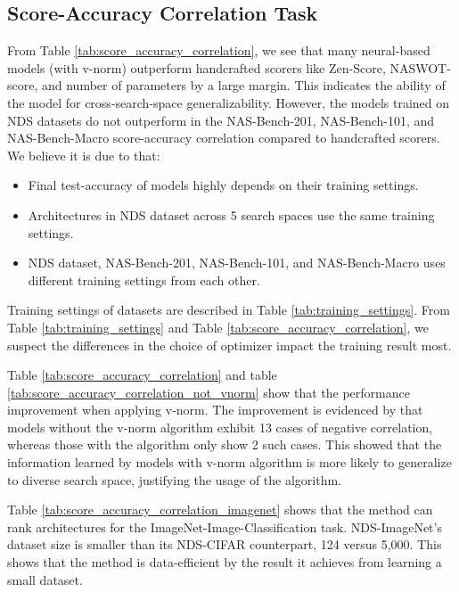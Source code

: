 \documentclass[lettersize,journal]{IEEEtran}
\begin{document}
    \subsection{Score-Accuracy Correlation Task}
        From Table \ref{tab:score_accuracy_correlation}, we see that many neural-based models (with v-norm) outperform handcrafted scorers like Zen-Score, NASWOT-score, and number of parameters by a large margin. This indicates the ability of the model for cross-search-space generalizability. However, the models trained on NDS datasets do not outperform in the NAS-Bench-201, NAS-Bench-101, and NAS-Bench-Macro score-accuracy correlation compared to handcrafted scorers. We believe it is due to that:
            \begin{itemize}
                \item Final test-accuracy of models highly depends on their training settings.
                \item Architectures in NDS dataset across 5 search spaces use the same training settings.
                \item NDS dataset, NAS-Bench-201, NAS-Bench-101, and NAS-Bench-Macro uses different training settings from each other.
            \end{itemize}
        Training settings of datasets are described in Table \ref{tab:training_settings}. From Table \ref{tab:training_settings} and Table \ref{tab:score_accuracy_correlation}, we suspect the differences in the choice of optimizer impact the training result most.

        Table \ref{tab:score_accuracy_correlation} and table \ref{tab:score_accuracy_correlation_not_vnorm} show that the performance improvement when applying v-norm. The improvement is evidenced by that models without the v-norm algorithm exhibit 13 cases of negative correlation, whereas those with the algorithm only show 2 such cases. This showed that the information learned by models with v-norm algorithm is more likely to generalize to diverse search space, justifying the usage of the algorithm.

        Table \ref{tab:score_accuracy_correlation_imagenet} shows that the method can rank architectures for the ImageNet-Image-Classification task. NDS-ImageNet's dataset size is smaller than its NDS-CIFAR counterpart, 124 versus 5,000. This shows that the method is data-efficient by the result it achieves from learning a small dataset.
        
\end{document}
